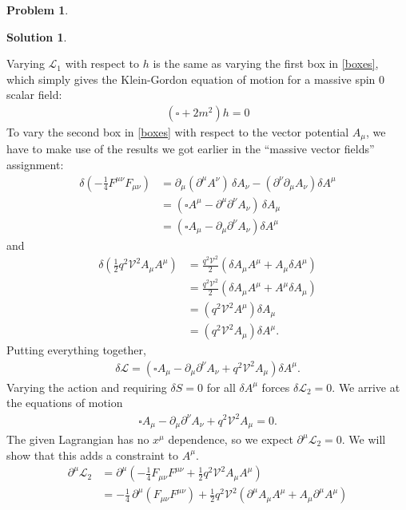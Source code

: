 \documentclass{book}
\numberwithin{equation}{section}
\theoremstyle{definition}
\newtheorem{prob}{Problem}[section]
\newtheorem{sln}{Solution}[section]
\newcommand{\p}{\partial}
\newcommand{\lag}{\mathcal{L}}
\newcommand{\V}{\mathcal{V}}
\begin{document}
\begin{prob}
\begin{sln}
\begin{enumerate}
				Varying $\lag_1$ with respect to $h$ is the same as varying the first box in \eqref{boxes}, which simply gives the Klein-Gordon equation of motion for a massive spin 0 scalar field:
				\begin{align}
				\boxed{(\square + 2m^2)h = 0}
				\end{align}
				To vary the second box in \eqref{boxes} with respect to the vector potential $A_\mu$, we have to make use of the results we got earlier in the ``massive vector fields'' assignment:
				\begin{align}
				\delta\left(-\frac{1}{4}F^{\mu\nu}F_{\mu\nu} \right) &= \partial_\mu(\partial^\mu A^\nu)\,\delta A_\nu - (\partial^\nu\partial_\mu A_\nu)\delta A^\mu\nonumber\\ 
				&= \left(\square A^\mu - \p^\mu\p^\nu A_\nu \right)\,\delta A_\mu\nonumber\\
				&= \left(\square A_\mu - \p_\mu \p^\nu A_\nu \right)\delta A^\mu
				\end{align}
				and
				\begin{align}
				\delta \left(\frac{1}{2}q^2\V^2 A_\mu A^\mu  \right) &= \frac{q^2\V^2}{2} \left( \delta A_\mu A^\mu + A_\mu \delta A^\mu \right)\nonumber\\
				&=  \frac{q^2\V^2}{2} \left( \delta A_\mu A^\mu + A^\mu \delta A_\mu \right)\\
				&= \left(q^2\V^2 A^\mu\right)\delta A_\mu \nonumber\\
				&= \left(q^2\V^2 A_\mu\right)\delta A^\mu.
				\end{align}
				Putting everything together, 
				\begin{align}
				\delta \lag = \left(\square A_\mu - \p_\mu \p^\nu A_\nu + q^2\V^2 A_\mu \right)\delta A^\mu.
				\end{align}
				Varying the action and requiring $\delta S = 0$ for all $\delta A^\mu$ forces $\delta \lag_2 =0$. We arrive at the equations of motion
				\begin{align}
				\square A_\mu - \p_\mu \p^\nu A_\nu +  q^2\V^2 A_\mu = 0.
				\end{align}
				The given Lagrangian has no $x^\mu$ dependence, so we expect $\p^\mu \lag_2 = 0$. We will show that this adds a constraint to $A^\mu$.
				\begin{align}
				\p^\mu\lag_2 &= \p^\mu\left( -\frac{1}{4}F_{\mu\nu}F^{\mu\nu} + \frac{1}{2}q^2\V^2 A_\mu A^\mu \right)\nonumber\\
				&= -\frac{1}{4}\,\p^\mu\left( F_{\mu\nu}F^{\mu\nu}\right) + \frac{1}{2}q^2\V^2\left(\p^\mu A_\mu A^\mu + A_\mu \p^\mu A^\mu \right)\nonumber\\

\end{align}
\end{enumerate}
\end{sln}
\end{prob}
\end{document}
